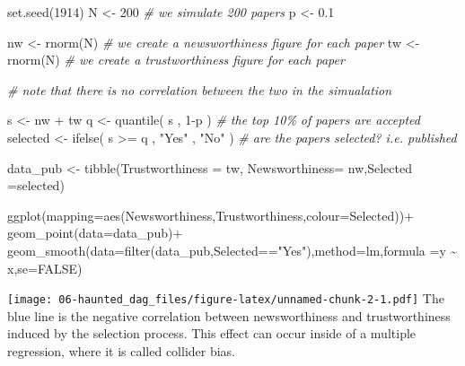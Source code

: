 \documentclass[
]{book}
\newenvironment{Shaded}{\begin{snugshade}}{\end{snugshade}}
\newcommand{\AttributeTok}[1]{\textcolor[rgb]{0.77,0.63,0.00}{#1}}
\newcommand{\CommentTok}[1]{\textcolor[rgb]{0.56,0.35,0.01}{\textit{#1}}}
\newcommand{\ConstantTok}[1]{\textcolor[rgb]{0.00,0.00,0.00}{#1}}
\newcommand{\DecValTok}[1]{\textcolor[rgb]{0.00,0.00,0.81}{#1}}
\newcommand{\FloatTok}[1]{\textcolor[rgb]{0.00,0.00,0.81}{#1}}
\newcommand{\FunctionTok}[1]{\textcolor[rgb]{0.00,0.00,0.00}{#1}}
\newcommand{\NormalTok}[1]{#1}
\newcommand{\OtherTok}[1]{\textcolor[rgb]{0.56,0.35,0.01}{#1}}
\newcommand{\SpecialCharTok}[1]{\textcolor[rgb]{0.00,0.00,0.00}{#1}}
\newcommand{\StringTok}[1]{\textcolor[rgb]{0.31,0.60,0.02}{#1}}
\begin{document}
\begin{Shaded}
\begin{Highlighting}[]
\FunctionTok{set.seed}\NormalTok{(}\DecValTok{1914}\NormalTok{) }
\NormalTok{N }\OtherTok{\textless{}{-}} \DecValTok{200} \CommentTok{\# we simulate 200 papers}
\NormalTok{p }\OtherTok{\textless{}{-}} \FloatTok{0.1} 

\NormalTok{nw }\OtherTok{\textless{}{-}} \FunctionTok{rnorm}\NormalTok{(N) }\CommentTok{\# we create a newsworthiness figure for each paper}
\NormalTok{tw }\OtherTok{\textless{}{-}} \FunctionTok{rnorm}\NormalTok{(N) }\CommentTok{\# we create a trustworthiness figure for each paper}

\CommentTok{\# note that there is no correlation between the two in the simualation}

\NormalTok{s }\OtherTok{\textless{}{-}}\NormalTok{ nw }\SpecialCharTok{+}\NormalTok{ tw }
\NormalTok{q }\OtherTok{\textless{}{-}} \FunctionTok{quantile}\NormalTok{( s , }\DecValTok{1}\SpecialCharTok{{-}}\NormalTok{p ) }\CommentTok{\# the top 10\% of papers are accepted}
\NormalTok{selected }\OtherTok{\textless{}{-}} \FunctionTok{ifelse}\NormalTok{( s }\SpecialCharTok{\textgreater{}=}\NormalTok{ q , }\StringTok{"Yes"}\NormalTok{ , }\StringTok{"No"}\NormalTok{ ) }\CommentTok{\# are the papers selected? i.e. published}


\NormalTok{data\_pub }\OtherTok{\textless{}{-}} \FunctionTok{tibble}\NormalTok{(}\AttributeTok{Trustworthiness =}\NormalTok{ tw, }\AttributeTok{Newsworthiness=}\NormalTok{ nw,}\AttributeTok{Selected =}\NormalTok{selected)}

\FunctionTok{ggplot}\NormalTok{(}\AttributeTok{mapping=}\FunctionTok{aes}\NormalTok{(Newsworthiness,Trustworthiness,}\AttributeTok{colour=}\NormalTok{Selected))}\SpecialCharTok{+}
  \FunctionTok{geom\_point}\NormalTok{(}\AttributeTok{data=}\NormalTok{data\_pub)}\SpecialCharTok{+}
    \FunctionTok{geom\_smooth}\NormalTok{(}\AttributeTok{data=}\FunctionTok{filter}\NormalTok{(data\_pub,Selected}\SpecialCharTok{==}\StringTok{"Yes"}\NormalTok{),}\AttributeTok{method=}\NormalTok{lm,}\AttributeTok{formula =}\StringTok{\textquotesingle{}y \textasciitilde{} x\textquotesingle{}}\NormalTok{,}\AttributeTok{se=}\ConstantTok{FALSE}\NormalTok{)}
\end{Highlighting}
\end{Shaded}

\texttt{[image: 06-haunted\_dag\_files/figure-latex/unnamed-chunk-2-1.pdf]}
The blue line is the negative correlation between newsworthiness and trustworthiness induced by the selection process. This effect can occur inside of a multiple regression, where it is called collider bias.
\end{document}
